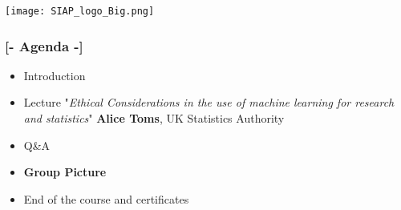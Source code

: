 \documentclass[xcolor=x11names,compress, aspectratio=169]{beamer}
\renewcommand{\(}{\begin{columns}}
\renewcommand{\)}{\end{columns}}
\newcommand{\<}[1]{\begin{column}{#1}}
\renewcommand{\>}{\end{column}}
\begin{document}


\begin{frame}
\Large{ \color{siap}{Machine Learning for Official Statistics and SDGs}}

\hspace{1cm}


\hspace{2cm}
\begin{center}

\texttt{[image: SIAP\_logo\_Big.png]}

\end{center}
\end{frame}




\begin{frame} %
\frametitle{\textcolor{brique}{[-  \textbf{Agenda} -]}}
\begin{itemize}[<+-|alert@+>]
   \item Introduction
   \item Lecture "\textit{Ethical Considerations in the use of machine learning for research and statistics}"
\textbf{Alice Toms}, UK Statistics Authority
   \item Q\&A
   \item[] \begin{center} \textcolor{brique}{\Large \textbf{Group Picture}} \end{center}
   \item End of the course and certificates
\end{itemize}
\end{frame}
\end{document}
